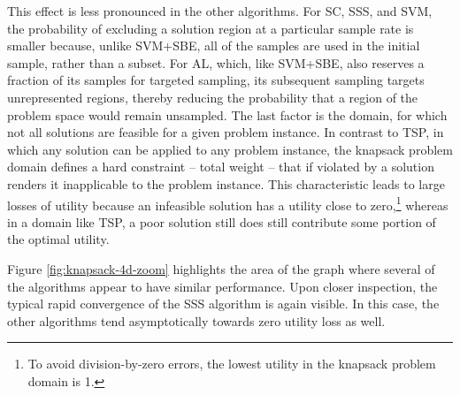 This effect is less pronounced in the other algorithms.  For SC, SSS, and SVM, the probability of excluding a solution region at a particular sample rate is smaller because, unlike SVM+SBE, all of the samples are used in the initial sample, rather than a subset.  For AL, which, like SVM+SBE, also reserves a fraction of its samples for targeted sampling, its subsequent sampling targets unrepresented regions, thereby reducing the probability that a region of the problem space would remain unsampled.  The last factor is the domain, for which not all solutions are feasible for a given problem instance.  In contrast to TSP, in which any solution can be applied to any problem instance, the knapsack problem domain defines a hard constraint -- total weight -- that if  violated by a solution renders it inapplicable to the problem instance.  This characteristic leads to large losses of utility because an infeasible solution has a utility close to zero,\footnote{To avoid division-by-zero errors, the lowest utility in the knapsack problem domain is 1.} whereas in a domain like  TSP, a poor solution still does still contribute some portion of the optimal utility.


Figure \ref{fig:knapsack-4d-zoom} highlights the area of the graph where several of the algorithms appear to have similar performance.  Upon closer inspection, the typical  rapid convergence of the SSS algorithm is again visible.  In this case, the other algorithms tend asymptotically towards zero utility loss as well.





